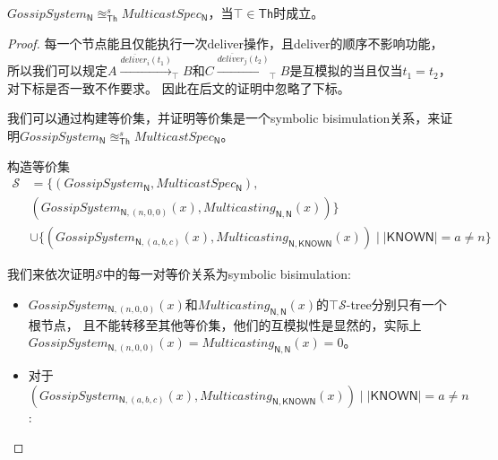 \begin{theorem}
    $GossipSystem_{\mathsf{N}} \approxeq^s_{\mathsf{Th}} MulticastSpec_{\mathsf{N}}$，当$\top \in \mathsf{Th}$时成立。
\end{theorem}
\begin{proof}
每一个节点能且仅能执行一次deliver操作，且deliver的顺序不影响功能，
所以我们可以规定$A\stackrel{\overline{deliver_i}(t_1)}{\longrightarrow}_{\top} B$和$C\stackrel{\overline{deliver_j}(t_2)}{\longrightarrow}_{\top}B$是互模拟的当且仅当$t_1=t_2$，对下标是否一致不作要求。
因此在后文的证明中忽略了下标。

我们可以通过构建等价集，并证明等价集是一个symbolic bisimulation关系，来证明$GossipSystem_{\mathsf{N}} \approxeq^s_{\mathsf{Th}} MulticastSpec_{\mathsf{N}}$。

构造等价集
\begin{align*}
   \mathcal{S}&=\{(GossipSystem_{\mathsf{N}}, MulticastSpec_{\mathsf{N}}), \\
      &(GossipSystem_{\mathsf{N},(n,0,0)}(x), Multicasting_{\mathsf{N},\mathsf{N}}(x))\}\\
      & \cup \{(GossipSystem_{\mathsf{N},(a,b,c)}(x), Multicasting_{\mathsf{N}, \mathsf{KNOWN}}(x))\mid |\mathsf{KNOWN}| = a\neq n\}
\end{align*}

我们来依次证明$\mathcal{S}$中的每一对等价关系为symbolic bisimulation:
\begin{itemize}
    \item {
       $GossipSystem_{\mathsf{N},(n,0,0)}(x)$和$Multicasting_{\mathsf{N},\mathsf{N}}(x)$的$\top \mathcal{S}$-tree分别只有一个根节点，
       且不能转移至其他等价集，他们的互模拟性是显然的，实际上$GossipSystem_{\mathsf{N},(n,0,0)}(x)=Multicasting_{\mathsf{N},\mathsf{N}}(x)=0$。
    }
    \item {
        对于$(GossipSystem_{\mathsf{N},(a,b,c)}(x), Multicasting_{\mathsf{N}, \mathsf{KNOWN}}(x))\mid |\mathsf{KNOWN}| = a\neq n$:

}
\end{itemize}
\end{proof}
